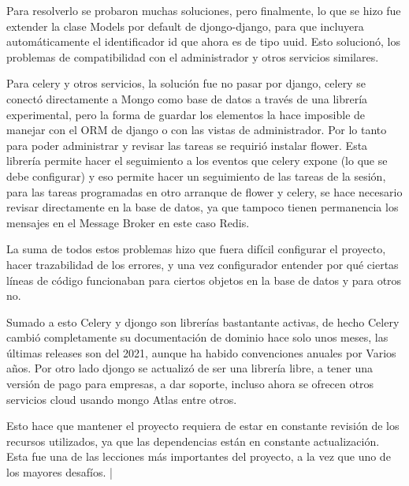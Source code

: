     \par Para resolverlo se probaron muchas soluciones, pero finalmente, lo que se hizo fue extender la clase Models por default de djongo-django, para que incluyera automáticamente el identificador id que ahora es de tipo uuid. Esto solucionó, los problemas de compatibilidad con el administrador y otros servicios similares.
    \par Para celery y otros servicios, la solución fue no pasar por django, celery se conectó directamente a Mongo como base de datos a través de una librería experimental, pero la forma de guardar los elementos la hace imposible de manejar con el ORM de django o con las vistas de administrador. Por lo tanto para poder administrar y revisar las tareas se requirió instalar flower. Esta librería permite hacer el seguimiento a los eventos que celery expone (lo que se debe configurar) y eso permite hacer un seguimiento de las tareas de la sesión, para las tareas programadas en otro arranque de flower y celery, se hace necesario revisar directamente en la base de datos, ya que tampoco tienen permanencia los mensajes en el Message Broker en este caso Redis.
    \par La suma de todos estos problemas hizo que fuera difícil configurar el proyecto, hacer trazabilidad de los errores, y una vez configurador entender por qué ciertas líneas de código funcionaban para ciertos objetos en la base de datos y para otros no.
    \par Sumado a esto Celery y djongo son librerías bastantante activas, de hecho Celery cambió completamente su documentación de dominio hace solo unos meses, las últimas releases son del 2021, aunque ha habido convenciones anuales por Varios años. Por otro lado djongo se actualizó de ser una librería libre, a tener una versión de pago para empresas, a dar soporte, incluso ahora se ofrecen otros servicios cloud usando mongo Atlas entre otros.
    \par Esto hace que mantener el proyecto requiera de estar en constante revisión de los recursos utilizados, ya que las dependencias están en constante actualización. Esta fue una de las lecciones más importantes del proyecto, a la vez que uno de los mayores desafíos.
|